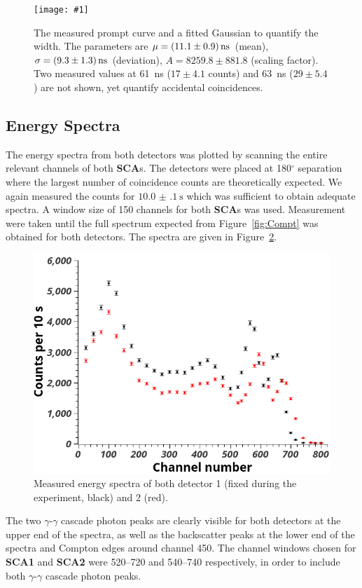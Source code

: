 \documentclass[twocolumn]{article}
\newcommand{\insertFigure}[1]{%
   \texttt{[image: \#1]}%
}
\begin{document}
\begin{figure}[!h]
	\centering
	\insertFigure{prompt.png}
	\caption{The measured prompt curve and a fitted Gaussian to quantify the width. The parameters are $\mu = \SI[separate-uncertainty = true]{11.1 \pm 0.9}{\nano\second}$ (mean), $\sigma = \SI[separate-uncertainty = true]{9.3 \pm 1.3}{\nano\second}$ (deviation), $A = 8259.8 \pm	881.8$ (scaling factor). Two measured values at 61~ns ($17 \pm 4.1$ counts) and 63~ns ($29 \pm 5.4$) are not shown, yet quantify accidental coincidences.}
	\label{fig:prompt}
\end{figure}

\subsection{Energy Spectra}
The energy spectra from both detectors was plotted by scanning the entire relevant channels of both \textbf{SCA}s. The detectors were placed at 180$^{\circ}$ separation where the largest number of coincidence counts are theoretically expected. We again measured the counts for $\SI[separate-uncertainty = true]{10.0(1) }{\second}$ which was sufficient to obtain adequate spectra. A window size of 150 channels for both \textbf{SCA}s was used. Measurement were taken until the full spectrum expected from Figure~\ref{fig:Compt} was obtained for both detectors. The spectra are given in Figure~\ref{fig:spectra}.
\begin{figure}[!h]
	\centering
	\includegraphics[width=0.9\linewidth]{detectors3.png}
	\caption{Measured energy spectra of both detector 1 (fixed during the experiment, black) and 2 (red).}
	\label{fig:spectra}
\end{figure}
The two $\gamma$-$\gamma$ cascade photon peaks are clearly visible for both detectors at the upper end of the spectra, as well as the backscatter peaks at the lower end of the spectra and Compton edges around channel 450. The channel windows chosen for \textbf{SCA1} and \textbf{SCA2} were 520--720 and 540--740 respectively, in order to include both $\gamma$-$\gamma$ cascade photon peaks.
\end{document}
